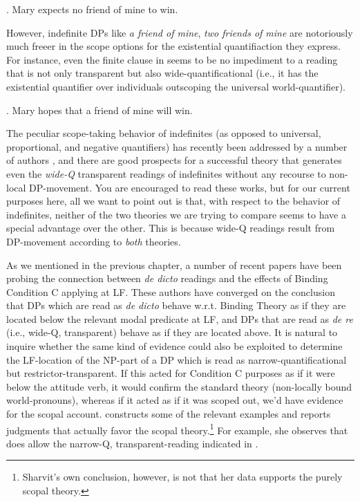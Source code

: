 \ex. Mary expects no friend of mine to win.

However, indefinite DPs like \emph{a friend of mine}, \emph{two friends of mine} are notoriously much freeer in the scope options for the existential quantifiaction they express. For instance, even the finite clause in \Next seems to be no impediment to a reading that is not only transparent but also wide-quantificational (i.e., it has the existential quantifier over individuals outscoping the universal world-quantifier).

\ex. Mary hopes that a friend of mine will win.

The peculiar scope-taking behavior of indefinites (as opposed to universal, proportional, and negative quantifiers) has recently been addressed by a number of authors \citep{abusch:1994:indefinites, reinhart:scope:97, winter:choice:97, matthewson:widescope:99, kratzer:pseudo:98}, and there are good prospects for a successful theory that generates even the \emph{wide-Q} transparent readings of indefinites without any recourse to non-local DP-movement. You are encouraged to read these works, but for our current purposes here, all we want to point out is that, with respect to the behavior of indefinites, neither of the two theories we are trying to compare seems to have a special advantage over the other. This is because wide-Q readings result from DP-movement according to \emph{both} theories.

As we mentioned in the previous chapter, a number of recent papers have been probing the connection between \emph{de dicto} readings and the effects of Binding Condition C applying at LF. These authors have converged on the conclusion that DPs which are read as \emph{de dicto} behave w.r.t. Binding Theory as if they are located below the relevant modal predicate at LF, and DPs that are read as \emph{de re} (i.e., wide-Q, transparent) behave as if they are located above. It is natural to inquire whether the same kind of evidence could also be exploited to determine the LF-location of the NP-part of a DP which is read as narrow-quantificational but restrictor-transparent. If this acted for Condition C purposes as if it were below the attitude verb, it would confirm the standard theory (non-locally bound world-pronouns), whereas if it acted as if it was scoped out, we'd have evidence for the scopal account. \citet{sharvit:howmany:98} constructs some of the relevant examples and reports judgments that actually favor the scopal theory.\footnote{Sharvit's own conclusion, however, is not that her data supports the purely scopal theory.} For example, she observes that \Next[a] does allow the narrow-Q, transparent-reading indicated in \Next[b].

